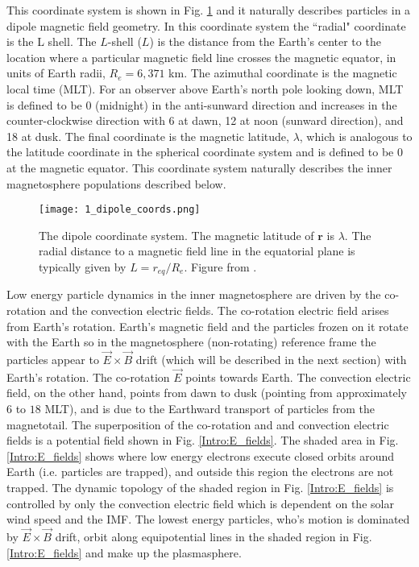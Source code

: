 This coordinate system is shown in Fig. \ref{Intro:dipole_coords} and it naturally describes particles in a dipole magnetic field geometry. In this coordinate system the ``radial" coordinate is the L shell. The $L$-shell ($L$) is the distance from the Earth's center to the location where a particular magnetic field line crosses the magnetic equator, in units of Earth radii, $R_e = 6,371$ km. The azimuthal coordinate is the magnetic local time (MLT). For an observer above Earth's north pole looking down, MLT is defined to be 0 (midnight) in the anti-sunward direction and increases in the counter-clockwise direction with 6 at dawn, 12 at noon (sunward direction), and 18 at dusk. The final coordinate is the magnetic latitude, $\lambda$, which is analogous to the latitude coordinate in the spherical coordinate system and is defined to be 0 at the magnetic equator. This coordinate system naturally describes the inner magnetosphere populations described below.

\begin{figure}
\texttt{[image: 1\_dipole\_coords.png]}
\caption{The dipole coordinate system. The magnetic latitude of $\mathbf{r}$ is $\lambda$. The radial distance to a magnetic field line in the equatorial plane is typically given by $L = r_{eq}/R_e$. Figure from \citet{Baumjohann1997}.}
\label{Intro:dipole_coords}
\end{figure}

Low energy particle dynamics in the inner magnetosphere are driven by the co-rotation and the convection electric fields. The co-rotation electric field arises from Earth's rotation. Earth's magnetic field and the particles frozen on it rotate with the Earth so in the magnetosphere (non-rotating) reference frame the particles appear to $\vec{E} \times \vec{B}$ drift (which will be described in the next section) with Earth's rotation. The co-rotation $\vec{E}$ points towards Earth. The convection electric field, on the other hand, points from dawn to dusk (pointing from approximately $6$ to $18$ MLT), and is due to the Earthward transport of particles from the magnetotail. The superposition of the co-rotation and and convection electric fields is a potential field shown in Fig. \ref{Intro:E_fields}. The shaded area in Fig. \ref{Intro:E_fields} shows where low energy electrons execute closed orbits around Earth (i.e. particles are trapped), and outside this region the electrons are not trapped. The dynamic topology of the shaded region in Fig. \ref{Intro:E_fields} is controlled by only the convection electric field which is dependent on the solar wind speed and the IMF. The lowest energy particles, who's motion is dominated by $\vec{E} \times \vec{B}$ drift, orbit along equipotential lines in the shaded region in Fig. \ref{Intro:E_fields} and make up the plasmasphere.

